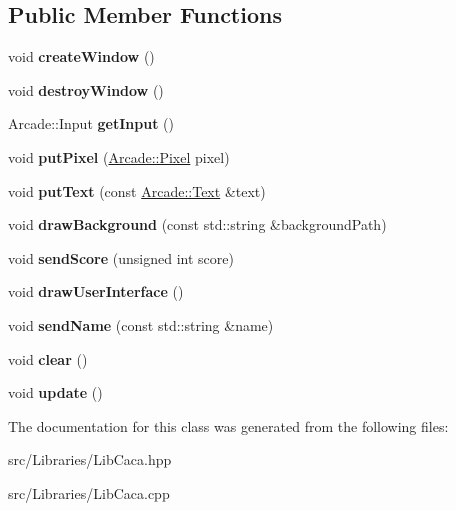 \subsection*{Public Member Functions}
\begin{DoxyCompactItemize}
\item 
\mbox{\label{class_arcade_1_1_lib_caca_ae3918f8b4ecc275f0cbd807197050b9a}} 
void {\bfseries create\+Window} ()
\item 
\mbox{\label{class_arcade_1_1_lib_caca_a825f6c9c47d466cc4fed08495c790bbe}} 
void {\bfseries destroy\+Window} ()
\item 
\mbox{\label{class_arcade_1_1_lib_caca_ae8b2aeeeb8657f1dfacab3f68f9bdf01}} 
Arcade\+::\+Input {\bfseries get\+Input} ()
\item 
\mbox{\label{class_arcade_1_1_lib_caca_af582e74761b4356b77222373763637e1}} 
void {\bfseries put\+Pixel} (\mbox{\hyperlink{struct_arcade_1_1_pixel}{Arcade\+::\+Pixel}} pixel)
\item 
\mbox{\label{class_arcade_1_1_lib_caca_a75e72a37708be917094c7701f3a3efb6}} 
void {\bfseries put\+Text} (const \mbox{\hyperlink{struct_arcade_1_1_text}{Arcade\+::\+Text}} \&text)
\item 
\mbox{\label{class_arcade_1_1_lib_caca_aebd4f7b7b1cef143dfd689a9ef7fb4f4}} 
void {\bfseries draw\+Background} (const std\+::string \&background\+Path)
\item 
\mbox{\label{class_arcade_1_1_lib_caca_a59ef9475b8d22b35f654513d2958d49d}} 
void {\bfseries send\+Score} (unsigned int score)
\item 
\mbox{\label{class_arcade_1_1_lib_caca_ab0fbaae32c1e17acba24e9bedea8331b}} 
void {\bfseries draw\+User\+Interface} ()
\item 
\mbox{\label{class_arcade_1_1_lib_caca_aeab911efbbf909329191a89afeed9d29}} 
void {\bfseries send\+Name} (const std\+::string \&name)
\item 
\mbox{\label{class_arcade_1_1_lib_caca_afa5402ae9cda10be3aa4ef167dc9d515}} 
void {\bfseries clear} ()
\item 
\mbox{\label{class_arcade_1_1_lib_caca_ad050187725b650516bb3841d0a4a0fea}} 
void {\bfseries update} ()
\end{DoxyCompactItemize}


The documentation for this class was generated from the following files\+:\begin{DoxyCompactItemize}
\item 
src/\+Libraries/Lib\+Caca.\+hpp\item 
src/\+Libraries/Lib\+Caca.\+cpp\end{DoxyCompactItemize}
